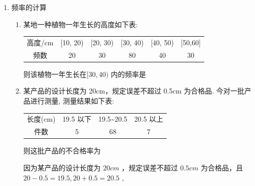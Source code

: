 \begin{enumerate}
\begin{enumerate}
\begin{jieda}
\begin{enumerate}
                \item 不公平由(1)知，所有由 1，2，3，4，5，6 组成的“三位递增数”有 20 个，记“甲参加数学竞赛”为事件 A，记“乙参加数学竞赛”为事件 B. 则事件 A 含有基本事件有:124，134，234，126，136，146，156，236，246, 256, 346, 356, 456 共 13 个.
                
                由古典概型计算公式, 得$P\left( A\right)  = \dfrac{\text{ 事件 }A\text{ 含有的基本事件的个数 }}{\text{ 试验所有基本事件的总数 }} = \dfrac{13}{20}$
                
                又 $A$ 与 $B$ 对立,所以 $P\left( B\right)  = 1 - P\left( A\right)  = 1 - \dfrac{13}{20} = \dfrac{7}{20}$ ,
                
                所以 $P\left( A\right)  > P\left( B\right)$ . 故选取规则对甲、乙两名学生不公平.
            \end{enumerate}
        \end{jieda}
    \end{enumerate}

    \item 频率的计算
    \begin{enumerate}
        \item 某地一种植物一年生长的高度如下表:
        
        \begin{center}
        \begin{tabular}{|c|c|c|c|c|c|}
        \hline
        高度/cm & [10, 20) & [20, 30) & [30, 40) & [40, 50) & [50,60] \\
        \cline{1-6}
        频数 & 20 & 30 & 80 & 40 & 30 \\
        \cline{1-6}
        \hline
        \end{tabular}
        \end{center}
        
        则该植物一年生长在$[30, 40)$ 内的频率是
        \item 某产品的设计长度为 20cm，规定误差不超过 0.5cm 为合格品. 今对一批产品进行测量, 测量结果如下表:

        \begin{center}
        \begin{tabular}{|c|c|c|c|}
        \hline
        长度(cm) & 19.5 以下 & 19.5\textasciitilde 20.5 & 20.5 以上 \\
        \cline{1-4}
        件数 & 5 & 68 & 7 \\
        \cline{1-4}
        \hline
        \end{tabular}
        \end{center}则这批产品的不合格率为
        \begin{jieda}
            因为某产品的设计长度为 ${20}{{cm}}$ ，规定误差不超过 ${0.5}{{cm}}$ 为合格品，且 ${20} - {0.5} = {19.5},{20} +  {0.5} = {20.5}$ ,
            

\end{jieda}
\end{enumerate}
\end{enumerate}
